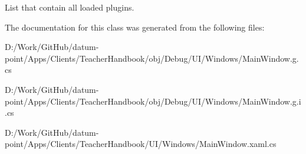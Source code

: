 List that contain all loaded plugins. 



The documentation for this class was generated from the following files\+:\begin{DoxyCompactItemize}
\item 
D\+:/\+Work/\+Git\+Hub/datum-\/point/\+Apps/\+Clients/\+Teacher\+Handbook/obj/\+Debug/\+U\+I/\+Windows/Main\+Window.\+g.\+cs\item 
D\+:/\+Work/\+Git\+Hub/datum-\/point/\+Apps/\+Clients/\+Teacher\+Handbook/obj/\+Debug/\+U\+I/\+Windows/Main\+Window.\+g.\+i.\+cs\item 
D\+:/\+Work/\+Git\+Hub/datum-\/point/\+Apps/\+Clients/\+Teacher\+Handbook/\+U\+I/\+Windows/Main\+Window.\+xaml.\+cs\end{DoxyCompactItemize}
